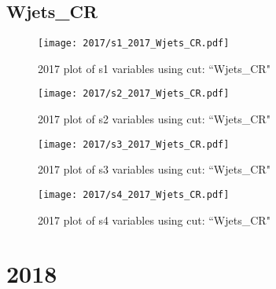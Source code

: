 \documentclass{article}
\begin{document}
      \subsection*{Wjets\_CR}
                        \begin{figure}[H]
                            \centering
                            \caption{2017 plot of s1 variables using cut: ``Wjets\_CR"}
                            \texttt{[image: 2017/s1\_2017\_Wjets\_CR.pdf]}
                        \end{figure}    
                        \begin{figure}[H]
                            \centering
                            \caption{2017 plot of s2 variables using cut: ``Wjets\_CR"}
                            \texttt{[image: 2017/s2\_2017\_Wjets\_CR.pdf]}
                        \end{figure}    
                        \begin{figure}[H]
                            \centering
                            \caption{2017 plot of s3 variables using cut: ``Wjets\_CR"}
                            \texttt{[image: 2017/s3\_2017\_Wjets\_CR.pdf]}
                        \end{figure}    
                        \begin{figure}[H]
                            \centering
                            \caption{2017 plot of s4 variables using cut: ``Wjets\_CR"}
                            \texttt{[image: 2017/s4\_2017\_Wjets\_CR.pdf]}
                        \end{figure}    
    \section*{2018}
\end{document}
